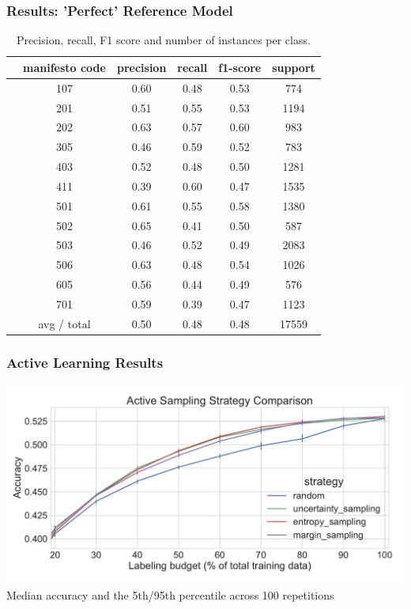 \documentclass[]{beamer}
\begin{document}
\begin{frame}\frametitle{Results: 'Perfect' Reference Model}
\footnotesize
\begin{table}
\centering
\begin{tabular}{cccccc}
\toprule
&  manifesto code & precision  &  recall&  f1-score &  support\\
\midrule
&   107&  0.60& 0.48& 0.53&  774\\
&   201&  0.51& 0.55& 0.53& 1194\\
&   202&  0.63& 0.57& 0.60&  983\\
&   305&  0.46& 0.59& 0.52&  783\\
&   403&  0.52& 0.48& 0.50& 1281\\
&   411&  0.39& 0.60& 0.47& 1535\\
&   501&  0.61& 0.55& 0.58& 1380\\
&   502&  0.65& 0.41& 0.50&  587\\
&   503&  0.46& 0.52& 0.49& 2083\\
&   506&  0.63& 0.48& 0.54& 1026\\
&   605&  0.56& 0.44& 0.49&  576\\
&   701&  0.59& 0.39& 0.47& 1123\\
\bottomrule
& avg / total&  0.50& 0.48& 0.48&17559\\
\end{tabular}
\caption{Precision, recall, F1 score and number of instances per class. }
\label{tab:baseline_model_report} 
\end{table}

\end{frame}

\begin{frame}\frametitle{Active Learning Results}
\begin{center}
\includegraphics[width=\textwidth]{images/active_learning_manifesto.pdf} \\
Median accuracy and the 5th/95th percentile across 100 repetitions \\
\end{center}

\end{frame}
\end{document}
